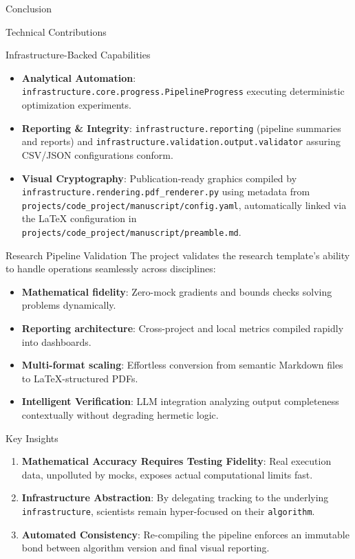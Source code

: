\documentclass[
  ignorenonframetext,
]{beamer}
\providecommand{\tightlist}{%
  \setlength{\itemsep}{0pt}\setlength{\parskip}{0pt}}
\begin{document}
\begin{frame}[fragile]{Conclusion}
\begin{block}{Technical Contributions}
\begin{block}{Infrastructure-Backed Capabilities}
\protect{}\label{infrastructure-backed-capabilities}
\begin{itemize}
\tightlist
\item
  \textbf{Analytical Automation}:
  \texttt{infrastructure.core.progress.PipelineProgress} executing
  deterministic optimization experiments.
\item
  \textbf{Reporting \& Integrity}: \texttt{infrastructure.reporting}
  (pipeline summaries and reports) and
  \texttt{infrastructure.validation.output.validator} assuring CSV/JSON
  configurations conform.
\item
  \textbf{Visual Cryptography}: Publication-ready graphics compiled by
  \texttt{infrastructure.rendering.pdf\_renderer.py} using metadata from
  \texttt{projects/code\_project/manuscript/config.yaml}, automatically
  linked via the LaTeX configuration in
  \texttt{projects/code\_project/manuscript/preamble.md}.
\end{itemize}
\end{block}
\end{block}

\begin{block}{Research Pipeline Validation}
\protect{}\label{research-pipeline-validation}
The project validates the research template's ability to handle
operations seamlessly across disciplines:

\begin{itemize}
\tightlist
\item
  \textbf{Mathematical fidelity}: Zero-mock gradients and bounds checks
  solving problems dynamically.
\item
  \textbf{Reporting architecture}: Cross-project and local metrics
  compiled rapidly into dashboards.
\item
  \textbf{Multi-format scaling}: Effortless conversion from semantic
  Markdown files to LaTeX-structured PDFs.
\item
  \textbf{Intelligent Verification}: LLM integration analyzing output
  completeness contextually without degrading hermetic logic.
\end{itemize}
\end{block}

\begin{block}{Key Insights}
\protect{}\label{key-insights}
\begin{enumerate}
\tightlist
\item
  \textbf{Mathematical Accuracy Requires Testing Fidelity}: Real
  execution data, unpolluted by mocks, exposes actual computational
  limits fast.
\item
  \textbf{Infrastructure Abstraction}: By delegating tracking to the
  underlying \texttt{infrastructure}, scientists remain hyper-focused on
  their \texttt{algorithm}.
\item
  \textbf{Automated Consistency}: Re-compiling the pipeline enforces an
  immutable bond between algorithm version and final visual reporting.
\end{enumerate}
\end{block}


\end{frame}
\end{document}
